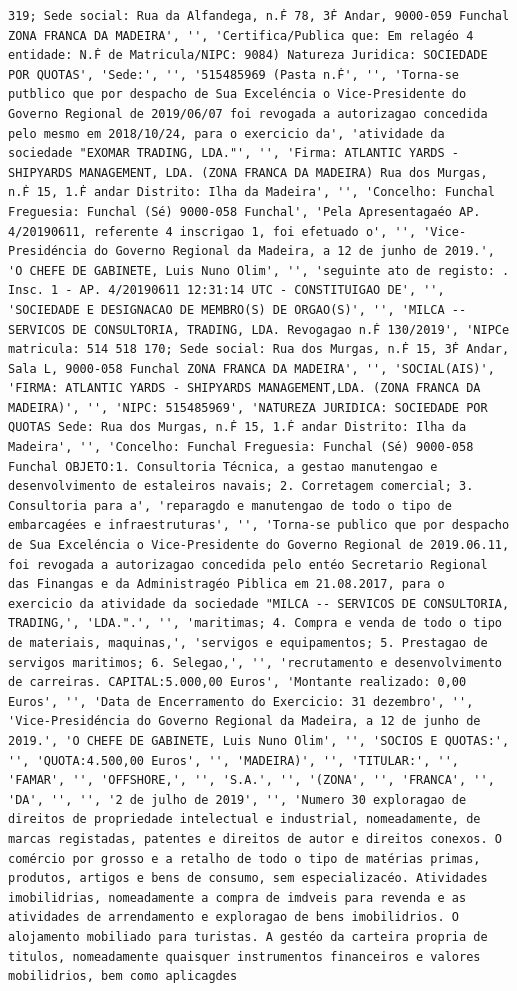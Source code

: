 \documentclass[
  12pt,
]{article}
\begin{document}
\begin{verbatim}
319; Sede social: Rua da Alfandega, n.Ḟ 78, 3Ḟ Andar, 9000-059 Funchal ZONA FRANCA DA MADEIRA', '', 'Certifica/Publica que: Em relagéo 4 entidade: N.Ḟ de Matricula/NIPC: 9084) Natureza Juridica: SOCIEDADE POR QUOTAS', 'Sede:', '', '515485969 (Pasta n.Ḟ', '', 'Torna-se putblico que por despacho de Sua Exceléncia o Vice-Presidente do Governo Regional de 2019/06/07 foi revogada a autorizagao concedida pelo mesmo em 2018/10/24, para o exercicio da', 'atividade da sociedade "EXOMAR TRADING, LDA."', '', 'Firma: ATLANTIC YARDS - SHIPYARDS MANAGEMENT, LDA. (ZONA FRANCA DA MADEIRA) Rua dos Murgas, n.Ḟ 15, 1.Ḟ andar Distrito: Ilha da Madeira', '', 'Concelho: Funchal Freguesia: Funchal (Sé) 9000-058 Funchal', 'Pela Apresentagaéo AP. 4/20190611, referente 4 inscrigao 1, foi efetuado o', '', 'Vice-Presidéncia do Governo Regional da Madeira, a 12 de junho de 2019.', 'O CHEFE DE GABINETE, Luis Nuno Olim', '', 'seguinte ato de registo: . Insc. 1 - AP. 4/20190611 12:31:14 UTC - CONSTITUIGAO DE', '', 'SOCIEDADE E DESIGNACAO DE MEMBRO(S) DE ORGAO(S)', '', 'MILCA -- SERVICOS DE CONSULTORIA, TRADING, LDA. Revogagao n.Ḟ 130/2019', 'NIPCe matricula: 514 518 170; Sede social: Rua dos Murgas, n.Ḟ 15, 3Ḟ Andar, Sala L, 9000-058 Funchal ZONA FRANCA DA MADEIRA', '', 'SOCIAL(AIS)', 'FIRMA: ATLANTIC YARDS - SHIPYARDS MANAGEMENT,LDA. (ZONA FRANCA DA MADEIRA)', '', 'NIPC: 515485969', 'NATUREZA JURIDICA: SOCIEDADE POR QUOTAS Sede: Rua dos Murgas, n.Ḟ 15, 1.Ḟ andar Distrito: Ilha da Madeira', '', 'Concelho: Funchal Freguesia: Funchal (Sé) 9000-058 Funchal OBJETO:1. Consultoria Técnica, a gestao manutengao e desenvolvimento de estaleiros navais; 2. Corretagem comercial; 3. Consultoria para a', 'reparagdo e manutengao de todo o tipo de embarcagées e infraestruturas', '', 'Torna-se publico que por despacho de Sua Exceléncia o Vice-Presidente do Governo Regional de 2019.06.11, foi revogada a autorizagao concedida pelo entéo Secretario Regional das Finangas e da Administragéo Piblica em 21.08.2017, para o exercicio da atividade da sociedade "MILCA -- SERVICOS DE CONSULTORIA, TRADING,', 'LDA.".', '', 'maritimas; 4. Compra e venda de todo o tipo de materiais, maquinas,', 'servigos e equipamentos; 5. Prestagao de servigos maritimos; 6. Selegao,', '', 'recrutamento e desenvolvimento de carreiras. CAPITAL:5.000,00 Euros', 'Montante realizado: 0,00 Euros', '', 'Data de Encerramento do Exercicio: 31 dezembro', '', 'Vice-Presidéncia do Governo Regional da Madeira, a 12 de junho de 2019.', 'O CHEFE DE GABINETE, Luis Nuno Olim', '', 'SOCIOS E QUOTAS:', '', 'QUOTA:4.500,00 Euros', '', 'MADEIRA)', '', 'TITULAR:', '', 'FAMAR', '', 'OFFSHORE,', '', 'S.A.', '', '(ZONA', '', 'FRANCA', '', 'DA', '', '', '2 de julho de 2019', '', 'Numero 30 exploragao de direitos de propriedade intelectual e industrial, nomeadamente, de marcas registadas, patentes e direitos de autor e direitos conexos. O comércio por grosso e a retalho de todo o tipo de matérias primas, produtos, artigos e bens de consumo, sem especializacéo. Atividades imobilidrias, nomeadamente a compra de imdveis para revenda e as atividades de arrendamento e exploragao de bens imobilidrios. O alojamento mobiliado para turistas. A gestéo da carteira propria de titulos, nomeadamente quaisquer instrumentos financeiros e valores mobilidrios, bem como aplicagdes 
\end{verbatim}
\end{document}
